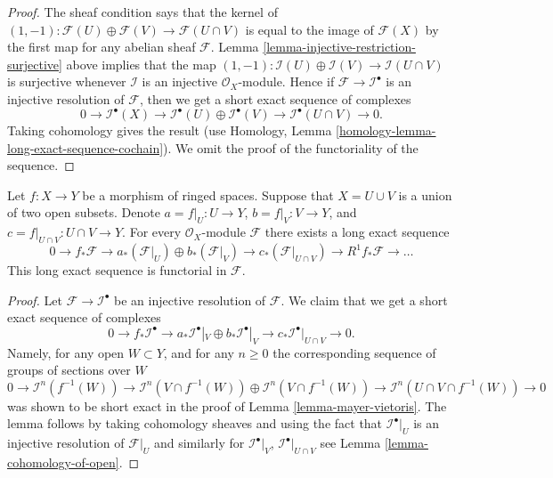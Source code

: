 \begin{proof}
The sheaf condition says that the kernel of
$(1, -1) : \mathcal{F}(U) \oplus \mathcal{F}(V) \to \mathcal{F}(U \cap V)$
is equal to the image of $\mathcal{F}(X)$ by the first map
for any abelian sheaf $\mathcal{F}$.
Lemma \ref{lemma-injective-restriction-surjective} above implies that the map
$(1, -1) : \mathcal{I}(U) \oplus \mathcal{I}(V) \to \mathcal{I}(U \cap V)$
is surjective whenever $\mathcal{I}$ is an injective $\mathcal{O}_X$-module.
Hence if $\mathcal{F} \to \mathcal{I}^\bullet$ is an injective resolution
of $\mathcal{F}$, then we get a short exact sequence of complexes
$$
0 \to
\mathcal{I}^\bullet(X) \to
\mathcal{I}^\bullet(U) \oplus \mathcal{I}^\bullet(V) \to
\mathcal{I}^\bullet(U \cap V) \to
0.
$$
Taking cohomology gives the result (use
Homology, Lemma \ref{homology-lemma-long-exact-sequence-cochain}).
We omit the proof of the functoriality of the sequence.
\end{proof}

\begin{lemma}
\label{lemma-relative-mayer-vietoris}
Let $f : X \to Y$ be a morphism of ringed spaces.
Suppose that $X = U \cup V$ is a union of two open subsets.
Denote $a = f|_U : U \to Y$, $b = f|_V : V \to Y$, and
$c = f|_{U \cap V} : U \cap V \to Y$.
For every $\mathcal{O}_X$-module $\mathcal{F}$
there exists a long exact sequence
$$
0 \to
f_*\mathcal{F} \to
a_*(\mathcal{F}|_U) \oplus b_*(\mathcal{F}|_V) \to
c_*(\mathcal{F}|_{U \cap V}) \to
R^1f_*\mathcal{F} \to \ldots
$$
This long exact sequence is functorial in $\mathcal{F}$.
\end{lemma}

\begin{proof}
Let $\mathcal{F} \to \mathcal{I}^\bullet$ be an injective resolution
of $\mathcal{F}$. We claim that we
get a short exact sequence of complexes
$$
0 \to
f_*\mathcal{I}^\bullet \to
a_*\mathcal{I}^\bullet|_V \oplus b_*\mathcal{I}^\bullet|_V \to
c_*\mathcal{I}^\bullet|_{U \cap V} \to
0.
$$
Namely, for any open $W \subset Y$, and for any $n \geq 0$ the
corresponding sequence of groups of sections over $W$
$$
0 \to
\mathcal{I}^n(f^{-1}(W)) \to
\mathcal{I}^n(V \cap f^{-1}(W))
\oplus \mathcal{I}^n(V \cap f^{-1}(W)) \to
\mathcal{I}^n(U \cap V \cap f^{-1}(W)) \to
0
$$
was shown to be short exact in the proof of Lemma \ref{lemma-mayer-vietoris}.
The lemma follows by taking cohomology sheaves and using the fact that
$\mathcal{I}^\bullet|_U$ is an injective resolution of $\mathcal{F}|_U$
and similarly for $\mathcal{I}^\bullet|_V$, $\mathcal{I}^\bullet|_{U \cap V}$
see Lemma \ref{lemma-cohomology-of-open}.
\end{proof}




















